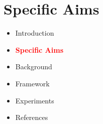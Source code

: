 \documentclass{beamer}
\begin{document}



  
  





\section{Specific Aims}

\begin{frame}{}

\begin{itemize}
  \item Introduction
  \item \textcolor{red}{\textbf{Specific Aims}}
  \item Background
  \item Framework
  \item Experiments
  \item References
  
\end{itemize}


\end{frame}
\end{document}
